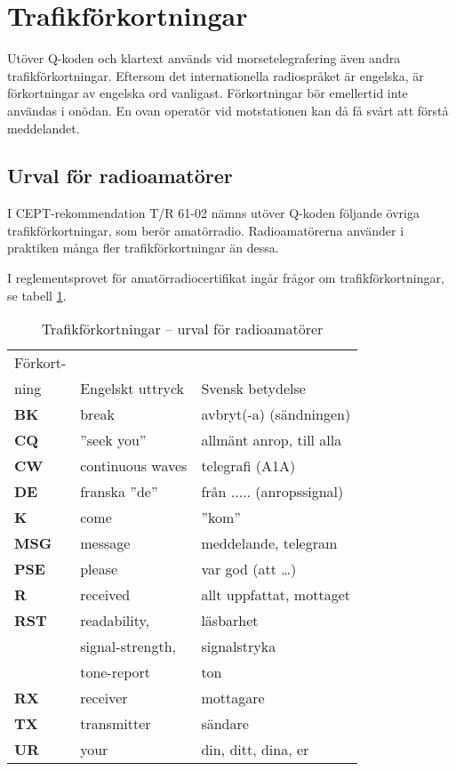 \section{Trafikförkortningar}
\label{trafikförkortningar}

Utöver Q-koden och klartext används vid morsetelegrafering även andra
trafikförkortningar.
Eftersom det internationella radiospråket är engelska, är förkortningar av
engelska ord vanligast.
Förkortningar bör emellertid inte användas i onödan.
En ovan operatör vid motstationen kan då få svårt att förstå meddelandet.

\subsection{Urval för radioamatörer}

I CEPT-rekommendation T/R 61-02 nämns utöver Q-koden följande övriga
trafikförkortningar, som berör amatörradio.
Radioamatörerna använder i praktiken många fler trafikförkortningar än dessa.

I reglementsprovet för amatörradiocertifikat ingår frågor om
trafikförkortningar, se tabell \ref{tab:trafikforkortningar}.

\begin{table}
  \begin{tabular}{lll}
    Förkort- & & \\
    ning & Engelskt uttryck & Svensk betydelse \\
    \hline
    \textbf{BK} & break & avbryt(-a) (sändningen) \\
    \textbf{CQ} & ''seek you'' & allmänt anrop, till alla \\
    \textbf{CW} & continuous waves & telegrafi (A1A) \\
    \textbf{DE} & franska ''de'' & från ..... (anropssignal) \\
    \textbf{K}  & come & ''kom'' \\
    \textbf{MSG} & message & meddelande, telegram \\
    \textbf{PSE} & please & var god (att \dots) \\
    \textbf{R} & received & allt uppfattat, mottaget \\
    \textbf{RST} & readability, & läsbarhet \\
   & signal-strength, & signalstryka \\
   & tone-report & ton \\
    \textbf{RX} & receiver & mottagare \\
    \textbf{TX} & transmitter & sändare \\
    \textbf{UR} & your & din, ditt, dina, er \\
  \end{tabular}
\caption{Trafikförkortningar -- urval för radioamatörer}
\label{tab:trafikforkortningar}
\end{table}

